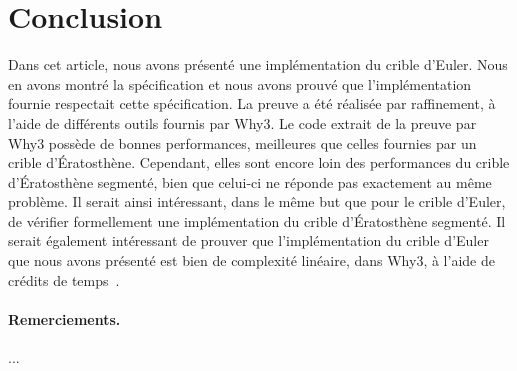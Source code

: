 \documentclass[a4paper]{easychair}
\begin{document}
\section{Conclusion}
\label{sec:conclusion}



Dans cet article, nous avons présenté une implémentation du crible d'Euler.
Nous en avons montré la spécification et nous avons prouvé que l'implémentation
fournie respectait cette spécification.
La preuve a été réalisée par raffinement, à l'aide de différents outils
fournis par Why3.
Le code extrait de la preuve par Why3 possède de bonnes performances,
meilleures que celles fournies par un crible d'Ératosthène.
Cependant, elles sont encore loin des performances du crible d'Ératosthène
segmenté, bien que celui-ci ne réponde pas exactement au même problème.
Il serait ainsi intéressant, dans le même but que pour le crible d'Euler,
de vérifier formellement une implémentation du crible d'Ératosthène
segmenté.
Il serait également intéressant de prouver que l'implémentation du crible
d'Euler que nous avons présenté est bien de complexité linéaire, dans Why3,
à l'aide de crédits de temps~\cite{}.


\paragraph{Remerciements.} ...



\end{document}
